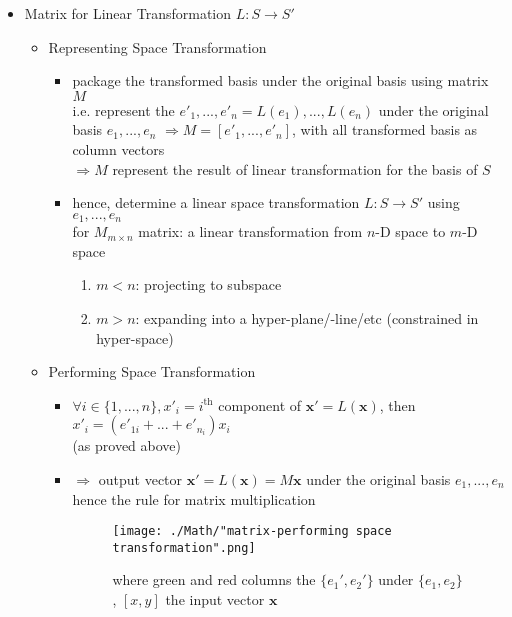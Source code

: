 \begin{itemize}
\item Matrix for Linear Transformation $L : S\rightarrow S'$
	\begin{itemize}
	\item Representing Space Transformation
		\begin{itemize}
		\item package the transformed basis under the original basis using matrix $M$ \\
		i.e. represent the $e'_1,...,e'_n = L(e_1),...,L(e_n)$ under the original basis $e_1,...,e_n$
		$\Rightarrow M = [e'_1, ..., e'_n]$, with all transformed basis as column vectors \\
		$\Rightarrow M$ represent the result of linear transformation for the basis of $S$
		\item hence, determine a linear space transformation $L:S\rightarrow S'$ using $e_1,...,e_n$ \\
		for $M_{m\times n}$ matrix: a linear transformation from $n$-D space to $m$-D space
			\begin{enumerate}
			\item $m<n$: projecting to subspace
			\item $m>n$: expanding into a hyper-plane/-line/etc (constrained in hyper-space)
			\end{enumerate}
		 
		\end{itemize}
	\item Performing Space Transformation
		\begin{itemize}
		\item $\displaystyle \forall i\in \{1,...,n\}, x'_i = i^\text{th}$ component of $\mathbf x'=L(\mathbf x)$, then $x'_i = (e'_{1i}+...+e'_{n_i})x_i$ \\
		(as proved above)
		\item $\Rightarrow$ output vector $\mathbf x' = L(\mathbf x)=M\mathbf x$ under the original basis $e_1,...,e_n$ \\
		hence the rule for matrix multiplication
		\begin{figure}[ht]
		\texttt{[image: ./Math/"matrix-performing space transformation".png]}
		\caption*{where green and red columns the $\{e_1',e_2'\}$ under $\{e_1,e_2\}$, $[x,y]$ the input vector $\mathbf x$}
		\end{figure}
		\end{itemize}
	\end{itemize}


\end{itemize}
